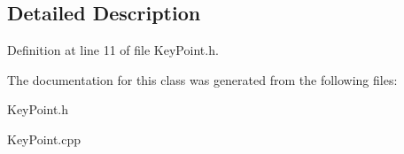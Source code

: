 \subsection{Detailed Description}


Definition at line 11 of file Key\+Point.\+h.



The documentation for this class was generated from the following files\+:\begin{DoxyCompactItemize}
\item 
Key\+Point.\+h\item 
Key\+Point.\+cpp\end{DoxyCompactItemize}
